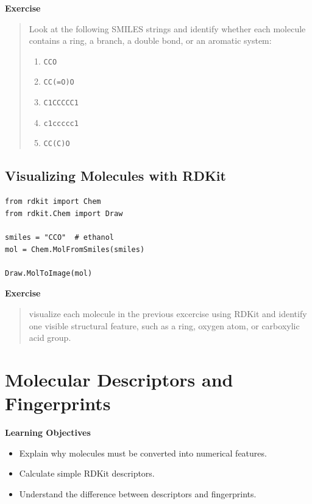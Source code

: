 \documentclass[11pt]{report}
\newenvironment{Important note}{\begin{quote}\color{red}\textbf{Important note:} }{\end{quote}}
\newenvironment{learningobjectives}
{\vspace{0.5em}\noindent\textbf{Learning Objectives}\begin{itemize}[leftmargin=*]}
{\end{itemize}\vspace{0.5em}}
\newenvironment{exercise}
{\vspace{0.5em}\noindent\textbf{Exercise}\begin{quote}}
{\end{quote}\vspace{0.5em}}
\begin{document}
\begin{exercise}
Look at the following SMILES strings and identify whether each molecule contains a ring, a branch, a double bond, or an aromatic system:

\begin{enumerate}[leftmargin=*]
    \item \texttt{CCO}
    \item \texttt{CC(=O)O}
    \item \texttt{C1CCCCC1}
    \item \texttt{c1ccccc1}
    \item \texttt{CC(C)O}
\end{enumerate}
\end{exercise}


\section{Visualizing Molecules with RDKit}

\begin{lstlisting}[style=pythonstyle, caption={Visualizing a molecule from SMILES using RDKit.}]
from rdkit import Chem
from rdkit.Chem import Draw

smiles = "CCO"  # ethanol
mol = Chem.MolFromSmiles(smiles)

Draw.MolToImage(mol)
\end{lstlisting}

\begin{exercise}
 visualize each molecule in the previous excercise using RDKit and identify one visible structural feature, such as a ring, oxygen atom, or carboxylic acid group.
\end{exercise}

\chapter{Molecular Descriptors and Fingerprints}

\begin{learningobjectives}
    \item Explain why molecules must be converted into numerical features.
    \item Calculate simple RDKit descriptors.
    \item Understand the difference between descriptors and fingerprints.
\end{learningobjectives}
\end{document}

